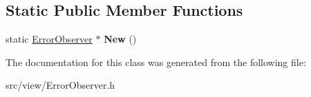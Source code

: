 \subsection*{Static Public Member Functions}
\begin{DoxyCompactItemize}
\item 
\hypertarget{class_error_observer_a6ff871db01ac3aaf8152e715faf8dd9d}{}static \hyperlink{class_error_observer}{Error\+Observer} $\ast$ {\bfseries New} ()\label{class_error_observer_a6ff871db01ac3aaf8152e715faf8dd9d}

\end{DoxyCompactItemize}


The documentation for this class was generated from the following file\+:\begin{DoxyCompactItemize}
\item 
src/view/Error\+Observer.\+h\end{DoxyCompactItemize}
